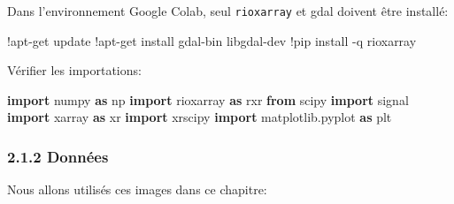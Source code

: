 \documentclass[
]{article}
\newenvironment{Shaded}{}{}
\newcommand{\BuiltInTok}[1]{\textcolor[rgb]{0.00,0.50,0.00}{#1}}
\newcommand{\ImportTok}[1]{\textcolor[rgb]{0.00,0.50,0.00}{\textbf{#1}}}
\newcommand{\NormalTok}[1]{#1}
\newcommand{\OperatorTok}[1]{\textcolor[rgb]{0.40,0.40,0.40}{#1}}
\begin{document}
Dans l'environnement Google Colab, seul \texttt{rioxarray} et gdal
doivent être installé:

\label{7e7dc626}
\label{cb1}
\begin{Shaded}
\begin{Highlighting}[]
\OperatorTok{!}\NormalTok{apt}\OperatorTok{{-}}\NormalTok{get update}
\OperatorTok{!}\NormalTok{apt}\OperatorTok{{-}}\NormalTok{get install gdal}\OperatorTok{{-}}\BuiltInTok{bin}\NormalTok{ libgdal}\OperatorTok{{-}}\NormalTok{dev}
\OperatorTok{!}\NormalTok{pip install }\OperatorTok{{-}}\NormalTok{q rioxarray}
\end{Highlighting}
\end{Shaded}

Vérifier les importations:

\label{5683ceab}
\label{cb2}
\begin{Shaded}
\begin{Highlighting}[]
\ImportTok{import}\NormalTok{ numpy }\ImportTok{as}\NormalTok{ np}
\ImportTok{import}\NormalTok{ rioxarray }\ImportTok{as}\NormalTok{ rxr}
\ImportTok{from}\NormalTok{ scipy }\ImportTok{import}\NormalTok{ signal}
\ImportTok{import}\NormalTok{ xarray }\ImportTok{as}\NormalTok{ xr}
\ImportTok{import}\NormalTok{ xrscipy}
\ImportTok{import}\NormalTok{ matplotlib.pyplot }\ImportTok{as}\NormalTok{ plt}
\end{Highlighting}
\end{Shaded}

\subsubsection{\texorpdfstring{{2.1.2}
Données}{2.1.2 Données}}\label{donnuxe9es}

Nous allons utilisés ces images dans ce chapitre:
\end{document}
